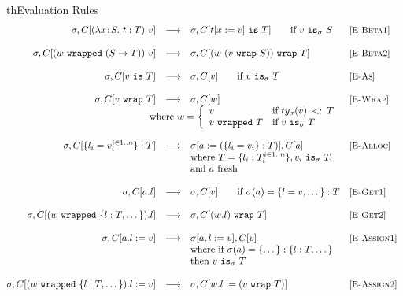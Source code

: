 \documentclass{article}
\newcommand{\lam}[4]{\lambda#1\!:\!#2.\,\,#4:#3}
\newcommand{\lamt}[2]{#1\rightarrow #2}
\newcommand{\app}[2]{#1~#2}
\newcommand{\cast}[2]{#1~\t{is}~#2}
\newcommand{\subtype}[2]{#1 \,\sword\, #2}
\newcommand{\sword}{\mbox{\,\,$<:$\,\,}}
\renewcommand{\t}[1]{{\tt #1}}
\newcommand{\red}[0]{\longrightarrow}  %
\newcommand{\lred}[0]{\red}  %
\newcommand{\objty}[1]{\{#1\}}
\newcommand{\obje}[2]{\{#1\}:{#2}}
\newcommand{\objget}[2]{#1.#2}
\newcommand{\objset}[3]{#1.#2:=#3}
\newcommand{\wrapv}[2]{#1~\t{wrapped}~#2}
\newcommand{\wrap}[2]{#1~\t{wrap}~#2}
\newcommand{\allocty}[1]{ty_{\sigma}(#1)}
\newcommand{\istype}[2]{#1~\t{is}_{\sigma}~ #2}
\begin{document}
\begin{displayfigure}{th}{Evaluation Rules}
\label{fig:eval} 
\footnotesize
\[
\begin{array}{@{}rcllr}
	\sigma,C[{\app{(\lam{x}{S}{T}{t})}{v}}]
	&\lred&
	\sigma,C[\cast{t[x:=v]}{T}]
	\qquad\mbox{if $\istype v S$}
	&\rel{E-Beta1}
\\~\\
	\sigma,C[{\app{(\wrapv{w}{(\lamt{S}{T})})}
	              {v}}]
	&\lred&
	\sigma,C[\wrap{(w~(\wrap{v}{S}))}{T}]
	&\rel{E-Beta2}
\\~\\
	\sigma,C[\cast{v}{T}]
	&\lred&
	\sigma,C[v]
	\qquad\mbox{if $\istype{v}{T}$}
	&\rel{E-As}
\\~\\
	\sigma,C[\wrap{v}{T}]
	&\lred&
	\sigma,C[w]
	&\rel{E-Wrap} \\
	\multicolumn{3}{r}{
	\mbox{where $w=\left\{
		\begin{array}{ll}
			v				&\mbox{if $\subtype{\allocty{v}}{T}$} \\
			\wrapv{v}{T}		&\mbox{if $\istype{v}{T}$}
		\end{array}\right.$}}
\\~\\
	\sigma,C[\obje{l_i=v_i^{i\in 1..n}}{T}]
	&\lred&
	\sigma[a:=(\obje{l_i=v_i}{T})],C[a] 
	&\rel{E-Alloc} \\
	&&\mbox{where }T=\objty{l_i:T_i^{i\in 1..n}}, \istype{v_i}{T_i} \\
	&&\mbox{and $a$ fresh}
\\~\\
	\sigma,C[\objget{a}{l}]
	&\lred&
	\sigma,C[v]
	\qquad\mbox{if $\sigma(a)=\obje{l=v,\dots}{T}$}
	&\rel{E-Get1}
\\~\\
	\sigma,C[\objget{(\wrapv{w}{\objty{l:T,\dots}})}{l}]
	&\lred&
	\sigma,C[\wrap{(\objget{w}{l})}{T}] 
	&\rel{E-Get2}
\\~\\
	\sigma,C[\objset{a}{l}{v}]
	&\lred&
	\sigma[a,l:=v],C[v] 
	&\rel{E-Assign1} \\
	&&\mbox{where if $\sigma(a)=\obje{\dots}{\objty{l:T,\dots}}$ }\\
	&&\mbox{then $\istype{v}{T}$} 
\\~\\
	\sigma,C[\objset{(\wrapv{w}{\objty{l:T,\dots}})}{l}{v}]
	&\lred&
	\sigma,C[\objset{w}{l}{(\wrap{v}{T})}]
	&\rel{E-Assign2} \\
\end{array}
\]
\end{displayfigure}
\end{document}

